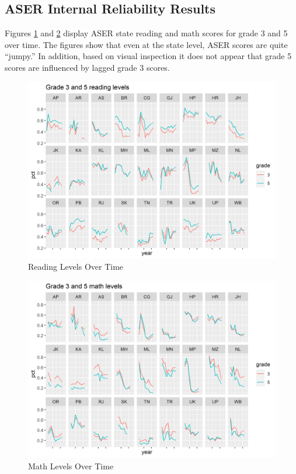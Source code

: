 \documentclass[
  11pt,
]{article}
\begin{document}
\hypertarget{aser-internal-reliability-results}{%
\subsection{ASER Internal Reliability Results}\label{aser-internal-reliability-results}}

Figures \ref{fig:aserread} and \ref{fig:asermath} display ASER state reading and math scores for grade 3 and 5 over time. The figures show that even at the state level, ASER scores are quite ``jumpy.'' In addition, based on visual inspection it does not appear that grade 5 scores are influenced by lagged grade 3 scores.

\begin{figure}

{\centering \includegraphics[width=0.8\linewidth]{aser reading over time} 

}

\caption{Reading Levels Over Time}\label{fig:aserread}
\end{figure}

\begin{figure}

{\centering \includegraphics[width=0.8\linewidth]{aser math over time} 

}

\caption{Math Levels Over Time}\label{fig:asermath}
\end{figure}
\end{document}
